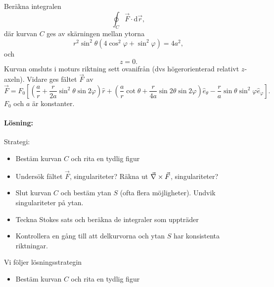 \documentclass[%
oneside,                 %
final,                   %
10pt]{article}
\newenvironment{notice_mdfboxadmon}[1][]{
\begin{notice_mdfboxmdframed}[frametitle=#1]
}
{
\end{notice_mdfboxmdframed}
}
\begin{document}
\begin{notice_mdfboxadmon}

Beräkna integralen
\begin{equation}
  \oint_C \vec{F}\cdot \mbox{d}\vec{r},
\end{equation}
där kurvan $C$ ges av skärningen mellan ytorna
\begin{equation}
  r^2\sin^2 \theta \left(4 \cos^2 \varphi + \sin^2 \varphi\right) = 4 a^2,
\end{equation}
och
\begin{equation}
  z = 0.
\end{equation}
Kurvan omsluts i moturs riktning sett ovanifrån (dvs högerorienterad relativt $z$-axeln). 
Vidare ges fältet $\vec{F}$ av
\begin{equation}
  \vec{F} = F_0 \left[\left(\frac{a}{r} + \frac{r}{2a}\sin^2 \theta \sin 2\varphi
\right) \hat{r} + \left(\frac{a}{r} \cot \theta + \frac{r}{4a} 
\sin 2 \theta \sin 2 \varphi\right) \hat{e}_\theta -
\frac{r}{a} \sin \theta \sin^2 \varphi \hat{e}_\varphi \right].
\end{equation}
$F_0$ och $a$ är konstanter. 

\paragraph{Lösning:}
Strategi:
\begin{itemize}
\item Bestäm kurvan $C$ och rita en tydlig figur

\item Undersök fältet $\vec{F}$, singulariteter? Räkna ut $\vec{\nabla} \times \vec{F}$, singulariteter?

\item Slut kurvan $C$ och bestäm ytan $S$ (ofta flera möjligheter). Undvik singulariteter på ytan.

\item Teckna Stokes sats och beräkna de integraler som uppträder

\item Kontrollera en gång till att delkurvorna och ytan $S$ har konsistenta riktningar.
\end{itemize}

\noindent
Vi följer lösningsstrategin
\begin{itemize}
\item Bestäm kurvan $C$ och rita en tydlig figur
\end{itemize}


\end{notice_mdfboxadmon}
\end{document}
